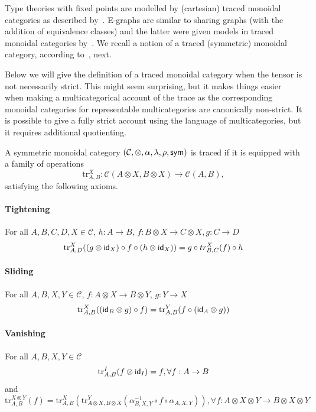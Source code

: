 \begin{example}
Type theories with fixed points are modelled by (cartesian) traced monoidal categories as described by~\citet{hasegawa_models_1999}.
E-graphs are similar to sharing graphs (with the addition of equivalence classes) and the latter were given models in traced monoidal categories by~\citet{hasegawa_models_1999}.
We recall a notion of a traced (symmetric) monoidal category, according to~\citet{Joyal_Street_Verity_1996}, next.

\begin{remark}
  Below we will give the definition of a traced monoidal category when the tensor is not necessarily strict.
  This might seem surprising, but it makes things easier when making a multicategorical account of the trace as the corresponding monoidal categories for representable multicategories are canonically non-strict.
  It is possible to give a fully strict account using the language of multicategories, but it requires additional quotienting.
\end{remark}

\begin{definition}
  A symmetric monoidal category $(\mathcal{C}, \otimes, \alpha, \lambda, \rho, \textsf{sym})$ is traced if it is equipped with a family of operations 
  \[
  \text{tr}_{A,B}^{X} : \mathcal{C}(A \otimes X, B \otimes X) \to \mathcal{C}(A,B),
  \]
  satisfying the following axioms.
  \paragraph{Tightening} For all $A,B,C,D,X \in \mathcal{C}$, $h : A \to B$, $f : B \otimes X \to C \otimes X, g : C \to D$
\[
\text{tr}_{A,D}^{X}((g \otimes \textsf{id}_{X}) \circ f \circ (h \otimes \textsf{id}_{X})) = g \circ tr_{B,C}^{X}(f) \circ h
\]
\paragraph{Sliding} For all $A,B,X,Y \in \mathcal{C}$, $f : A \otimes X \to B \otimes Y$, $g : Y \to X$
\[
\text{tr}_{A,B}^{X}((\textsf{id}_{B} \otimes g) \circ f) = \text{tr}_{A,B}^{Y}(f \circ (\textsf{id}_{A} \otimes g))
\]
\paragraph{Vanishing} For all $A,B,X,Y \in \mathcal{C}$
\[
\text{tr}_{A,B}^{I}(f \otimes \textsf{id}_{I}) = f, \forall f : A \to B
\]
and
\[
\text{tr}_{A,B}^{X \otimes Y}(f) = \text{tr}_{A,B}^{X}(\text{tr}_{A \otimes X, B \otimes X}^{Y}(\alpha^{-1}_{B,X,Y} \circ f \circ \alpha_{A,X,Y})), \forall f : A \otimes X \otimes Y \to B \otimes X \otimes Y
\]

\end{definition}
\end{example}
